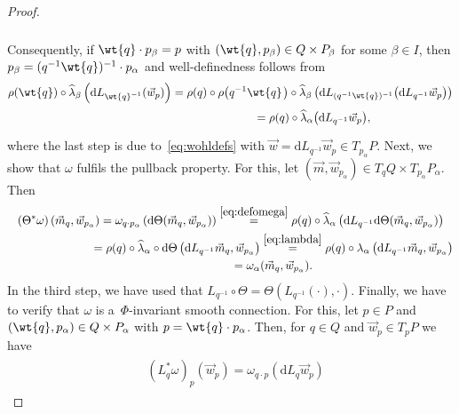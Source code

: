\documentclass[pdftex]{sigma}
\numberwithin{equation}{section}
\begin{document}
\begin{proof}
\begin{gather}
\begin{split}
\end{split}
\label{eq:thirdstep}
\end{gather}
Consequently, if $\wt{q}\cdot p_\beta=p$ with $(\wt{q},p_\beta)\in Q\times P_\beta$ for some $\beta \in I$, then
$p_\beta=(q^{-1}\wt{q})^{-1}\cdot p_\alpha$ and well-def\/inedness follows from
\begin{gather*}
\rho(\wt{q})\circ \widehat{\lambda}_\beta\left(\mathrm{d}
L_{{\wt{q}}^{-1}}(\vec{w}_p)\right)=\rho(q)\circ\rho\big(q^{-1}\wt{q}\hspace{1pt}\big)\circ\widehat{\lambda}_\beta\left(\mathrm{d}
L_{(q^{-1}\wt{q})^{-1}}\big( \mathrm{d} L_{q^{-1}}\vec{w}_p\big)\right)
\\
\phantom{\rho(\wt{q})\circ \widehat{\lambda}_\beta\left(\mathrm{d}
L_{{\wt{q}}^{-1}}(\vec{w}_p)\right)}
{} =\rho(q)\circ \widehat{\lambda}_\alpha\big(\mathrm{d} L_{q^{-1}}\vec{w}_p\big),
\end{gather*}
where the last step is due to~\eqref{eq:wohldefs} with $\vec{w}=\mathrm{d} L_{q^{-1}}\vec{w}_p\in T_{p_\alpha}P$.
Next, we show that $\omega$ fulf\/ils the pullback property.
For this, let $(\vec{m},\vec{w}_{p_\alpha})\in T_qQ\times T_{p_\alpha}P_\alpha$.
Then
\begin{gather*}
(\Theta^{*}\omega)\left(\vec{m}_q,\vec{w}_{p_\alpha}\right)
=\omega_{q\cdot p_\alpha}\left(\mathrm{d}\Theta(\vec{m}_q,\vec{w}_{p_\alpha})\right) \stackrel{\eqref{eq:defomega}}{=}\rho(q)\circ
\widehat{\lambda}_\alpha\left(\mathrm{d} L_{q^{-1}}\mathrm{d}\Theta(\vec{m}_q,\vec{w}_{p_\alpha})\right)
\\
\phantom{(\Theta^{*}\omega)\left(\vec{m}_q,\vec{w}_{p_\alpha}\right)}
=\rho(q)\circ \widehat{\lambda}_\alpha\circ \mathrm{d}\Theta\left(\mathrm{d} L_{q^{-1}}
\vec{m}_q,\vec{w}_{p_\alpha}\right) \stackrel{\eqref{eq:lambda}}{=}\rho(q)\circ \lambda_\alpha\left(\mathrm{d}
L_{q^{-1}} \vec{m}_q,\vec{w}_{p_\alpha}\right)
\\
\phantom{(\Theta^{*}\omega)\left(\vec{m}_q,\vec{w}_{p_\alpha}\right)}
=\omega_\alpha(\vec{m}_q,\vec{w}_{p_\alpha}).
\end{gather*}
In the third step, we have used that $L_{q^{-1}}\circ \Theta= \Theta(L_{q^{-1}}(\cdot),\cdot)$.
Finally, we have to verify that $\omega$ is a~$\Phi$-invariant smooth connection.
For this, let $p\in P$ and $(\wt{q},p_\alpha)\in Q\times P_\alpha$ with $p=\wt{q}\cdot p_\alpha$.
Then, for $q\in Q$ and $\vec{w}_p\in T_pP$ we have
\begin{gather*}
\begin{split}
&\left(L_q^{*}\omega\right)_{p}(\vec{w}_{p})=\omega_{q\cdot p}\left(\mathrm{d} L_q \vec{w}_{p}\right)

\end{split}
\end{gather*}
\end{proof}
\end{document}
